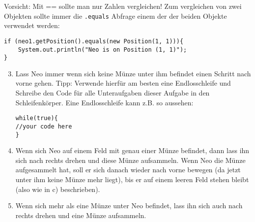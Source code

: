 \begin{Infobox}[\lstinline{==} und \lstinline{.equals()}]
	Vorsicht: Mit == sollte man nur Zahlen vergleichen! 
	Zum vergleichen von zwei Objekten sollte immer die \lstinline{.equals} Abfrage einem der der beiden Objekte verwendet werden:

	\begin{lstlisting}
if (neo1.getPosition().equals(new Position(1, 1))){
	System.out.println("Neo is on Position (1, 1)");
}
	\end{lstlisting}

\end{Infobox}


\begin{enumerate}\setcounter{enumi}{2}
	\item
		Lass Neo immer wenn sich keine Münze unter ihm befindet einen Schritt nach vorne gehen.
		Tipp: Verwende hierfür am besten eine Endlosschleife und Schreibe den Code für alle Unteraufgaben dieser Aufgabe in den Schleifenkörper.
		Eine Endlosschleife kann z.B. so aussehen:
	\begin{lstlisting}
while(true){
//your code here
}
	\end{lstlisting}

	\item
		Wenn sich Neo auf einem Feld mit genau einer Münze befindet, dann lass ihn sich nach rechts drehen und diese Münze aufsammeln. 
		Wenn Neo die Münze aufgesammelt hat, soll er sich danach wieder nach vorne bewegen (da jetzt unter ihm keine Münze mehr liegt), bis er auf einem leeren Feld stehen bleibt (also wie in c) beschrieben).


	\item
		Wenn sich mehr als eine Münze unter Neo befindet, lass ihn sich auch nach rechts drehen und eine Münze aufsammeln.
\end{enumerate}


